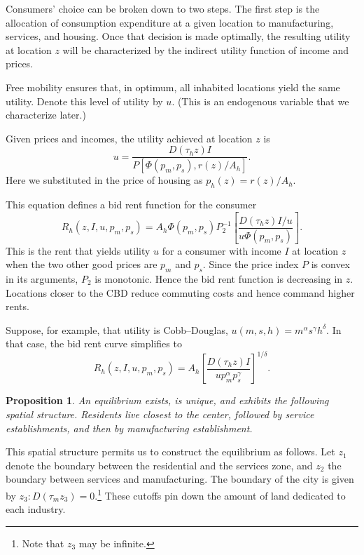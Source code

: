 \documentclass[12pt]{article}
\newtheorem{proposition}{Proposition}
\begin{document}
\bigskip

Consumers' choice can be broken down to two steps. The first step is the allocation of consumption expenditure at a given location to manufacturing, services, and housing. Once that decision is made optimally, the resulting utility at location $z$ will be characterized by the indirect utility function of income and prices.

Free mobility ensures that, in optimum, all inhabited locations yield the same utility. Denote this level of utility by $u$. (This is an endogenous variable that we characterize later.)

Given prices and incomes, the utility achieved at location $z$ is
    \[
    u = \frac{D(\tau_h z) I}{P[\Phi(p_m,p_s),r(z)/A_h]}.
    \]
Here we substituted in the price of housing as $p_h(z) = r(z)/A_h$.

This equation defines a bid rent function for the consumer
\begin{equation}\label{eq:bidrent:hh}
R_h(z,I,u,p_m,p_s) = A_h\Phi(p_m,p_s)P_2^{-1}\left[\frac{D(\tau_h z) I/u}{u\Phi(p_m,p_s)}\right].
\end{equation}
This is the rent that yields utility $u$ for a consumer with income $I$ at location $z$ when the two other good prices are $p_m$ and $p_s$. Since the price index $P$ is convex in its arguments, $P_2$ is monotonic. Hence the bid rent function is decreasing in $z$. Locations closer to the CBD reduce commuting costs and hence command higher rents.

Suppose, for example, that utility is Cobb--Douglas, $u(m,s,h) = m^\alpha s^\gamma h^\delta$. In that case, the bid rent curve simplifies to
\[
R_h(z,I,u,p_m,p_s) = A_h\left[\frac{D(\tau_h z) I}{up_m^{\alpha}p_s^{\gamma}}\right]^{1/\delta}.
\]

\begin{proposition}\label{prop:spatial}
An equilibrium exists, is unique, and exhibits the following spatial structure. Residents live closest to the center, followed by service establishments, and then by manufacturing establishment.
\end{proposition}

This spatial structure permits us to construct the equilibrium as follows. Let $z_1$ denote the boundary between the residential and the services zone, and $z_2$ the boundary between services and manufacturing. The boundary of the city is given by $z_3: D(\tau_m z_3)=0$.\footnote{Note that $z_3$ may be infinite.} These cutoffs pin down the amount of land dedicated to each industry.
\end{document}
